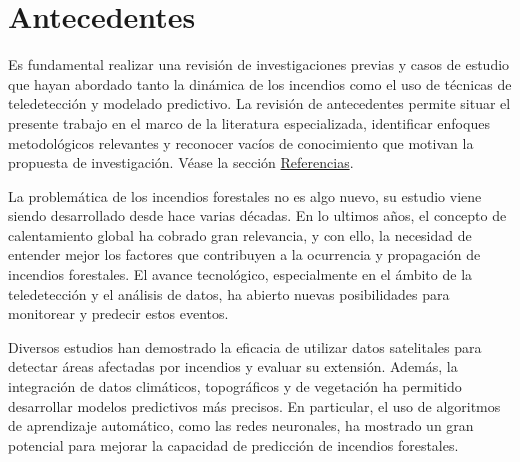 \section{Antecedentes}
Es fundamental realizar una revisión de investigaciones previas y casos de estudio que hayan abordado tanto la dinámica de los incendios como el uso de técnicas de teledetección y modelado predictivo. La revisión de antecedentes permite situar el presente trabajo en el marco de la literatura especializada, identificar enfoques metodológicos relevantes y reconocer vacíos de conocimiento que motivan la propuesta de investigación. Véase la sección \hyperref[sec:refs]{Referencias}.

La problemática de los incendios forestales no es algo nuevo, su estudio viene siendo desarrollado desde hace varias décadas. En lo ultimos años, el concepto de calentamiento global ha cobrado gran relevancia, y con ello, la necesidad de entender mejor los factores que contribuyen a la ocurrencia y propagación de incendios forestales. El avance tecnológico, especialmente en el ámbito de la teledetección y el análisis de datos, ha abierto nuevas posibilidades para monitorear y predecir estos eventos.

Diversos estudios han demostrado la eficacia de utilizar datos satelitales para detectar áreas afectadas por incendios y evaluar su extensión. Además, la integración de datos climáticos, topográficos y de vegetación ha permitido desarrollar modelos predictivos más precisos. En particular, el uso de algoritmos de aprendizaje automático, como las redes neuronales, ha mostrado un gran potencial para mejorar la capacidad de predicción de incendios forestales.

